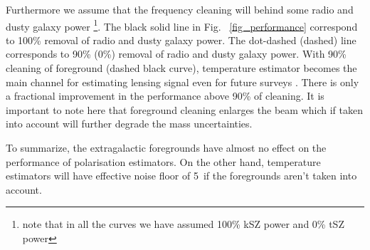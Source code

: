  
 Furthermore we assume that the frequency cleaning will behind some radio and dusty galaxy power \footnote{note that in all the curves we have assumed 100\% kSZ power and 0\% tSZ power}. 
 The black solid line in Fig. ~\ref{fig_performance} correspond to 100\% removal of radio and dusty galaxy power. 
 The dot-dashed (dashed) line corresponds to 90\% (0\%) removal of radio and dusty galaxy power. 
 With 90\% cleaning of foreground (dashed black curve), temperature estimator becomes the main channel for estimating lensing signal even for future surveys \citep{cmbs4-sb1}.
  There is only a fractional improvement in the performance above 90\% of cleaning. 
  It is important to note here that foreground cleaning enlarges the beam which if taken into account will further degrade the mass uncertainties.
  
  To summarize, the extragalactic foregrounds have almost no effect on the performance of polarisation estimators. 
  On the other hand, temperature estimators will have effective noise floor of 5\ukam\ if the foregrounds aren't taken into account. 
  
